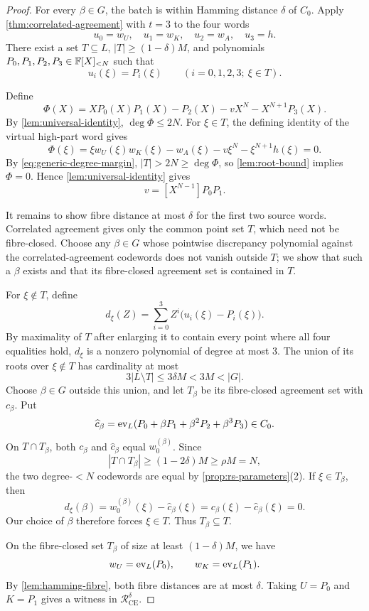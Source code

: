 \begin{proof}
For every $\beta\in G$, the batch is within Hamming distance $\delta$ of $C_0$.  Apply \cref{thm:correlated-agreement} with $t=3$ to the four words
\[
  u_0=w_U,
  \quad
  u_1=w_K,
  \quad
  u_2=w_A,
  \quad
  u_3=h.
\]
There exist a set $T\subseteq L$, $|T|\ge(1-\delta)M$, and polynomials $P_0,P_1,P_2,P_3\in\mathbb{F}[X]_{<N}$ such that
\[
  u_i(\xi)=P_i(\xi)
  \qquad
  (i=0,1,2,3;\ \xi\in T).
\]

Define
\[
  \Phi(X)
  =
  XP_0(X)P_1(X)-P_2(X)-vX^N-X^{N+1}P_3(X).
\]
By \cref{lem:universal-identity}, $\deg\Phi\le2N$.  For $\xi\in T$, the defining identity of the virtual high-part word gives
\[
  \Phi(\xi)
  =
  \xi w_U(\xi)w_K(\xi)-w_A(\xi)-v\xi^N-\xi^{N+1}h(\xi)
  =0.
\]
By \eqref{eq:generic-degree-margin}, $|T|>2N\ge\deg\Phi$, so \cref{lem:root-bound} implies $\Phi=0$.  Hence \cref{lem:universal-identity} gives
\[
  v=[X^{N-1}]P_0P_1.
\]

It remains to show fibre distance at most $\delta$ for the first two source words.  Correlated agreement gives only the common point set $T$, which need not be fibre-closed.  Choose any $\beta\in G$ whose pointwise discrepancy polynomial against the correlated-agreement codewords does not vanish outside $T$; we show that such a $\beta$ exists and that its fibre-closed agreement set is contained in $T$.

For $\xi\notin T$, define
\[
  d_\xi(Z)
  =
  \sum_{i=0}^{3}Z^i\bigl(u_i(\xi)-P_i(\xi)\bigr).
\]
By maximality of $T$ after enlarging it to contain every point where all four equalities hold, $d_\xi$ is a nonzero polynomial of degree at most $3$.  The union of its roots over $\xi\notin T$ has cardinality at most
\[
  3|L\setminus T|\le3\delta M<3M<|G|.
\]
Choose $\beta\in G$ outside this union, and let $T_\beta$ be its fibre-closed agreement set with $c_\beta$.  Put
\[
  \widehat c_\beta
  =
  \operatorname{ev}_L(P_0+\beta P_1+\beta^2P_2+\beta^3P_3)\in C_0.
\]
On $T\cap T_\beta$, both $c_\beta$ and $\widehat c_\beta$ equal $w_0^{(\beta)}$.  Since
\[
  |T\cap T_\beta|
  \ge(1-2\delta)M
  \ge \rho M
  =N,
\]
the two degree-$<N$ codewords are equal by \cref{prop:rs-parameters}(2).  If $\xi\in T_\beta$, then
\[
  d_\xi(\beta)
  =w_0^{(\beta)}(\xi)-\widehat c_\beta(\xi)
  =c_\beta(\xi)-\widehat c_\beta(\xi)
  =0.
\]
Our choice of $\beta$ therefore forces $\xi\in T$.  Thus $T_\beta\subseteq T$.

On the fibre-closed set $T_\beta$ of size at least $(1-\delta)M$, we have
\[
  w_U=\operatorname{ev}_L(P_0),
  \qquad
  w_K=\operatorname{ev}_L(P_1).
\]
By \cref{lem:hamming-fibre}, both fibre distances are at most $\delta$.  Taking $U=P_0$ and $K=P_1$ gives a witness in $\mathcal R^{\delta}_{\mathrm{CE}}$.
\end{proof}

